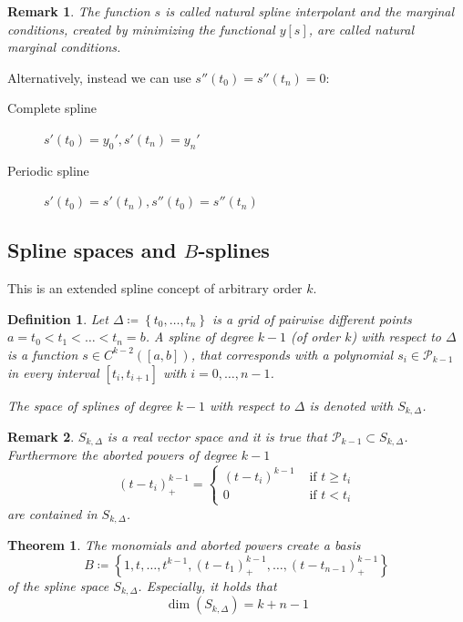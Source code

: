 \documentclass[a4paper]{article}
\newcounter{lecref}[section]
\numberwithin{lecref}{section}
\theoremstyle{break}
\newtheorem*{Thm}{Theorem}
\newtheorem{definition}[lecref]{Definition}
\newtheorem*{Remark}{Remark}
\newcommand{\Set}[1]{\left\{#1\right\}}
\begin{document}
\begin{Remark}
  The function $s$ is called \emph{natural spline interpolant} and the marginal conditions, created by minimizing the functional $y[s]$, are called \emph{natural marginal conditions}.
\end{Remark}

Alternatively, instead we can use $s''(t_0) = s''(t_n) = 0$:
\begin{description}
  \item[Complete spline]  $s'(t_0) = y_0', s'(t_n) = y_n'$
  \item[Periodic spline] $s'(t_0) = s'(t_n), s''(t_0) = s''(t_n)$
\end{description}

\subsection{Spline spaces and $B$-splines}

This is an extended spline concept of arbitrary order $k$.

\begin{definition}
  \label{definition:4-19}
  Let $\Delta \coloneqq \Set{t_0, \dots, t_n}$ is a grid of pairwise different points $a = t_0 < t_1 < \dots < t_n = b$.
  A spline of degree $k-1$ (of order $k$) with respect to $\Delta$ is a function $s \in C^{k-2}([a,b])$, that corresponds with a polynomial $s_i \in \mathcal P_{k-1}$ in every interval $[t_i, t_{i+1}]$ with $i = 0, \dots, n-1$.

  The space of splines of degree $k-1$ with respect to $\Delta$ is denoted with $S_{k, \Delta}$.
\end{definition}

\begin{Remark}
  $S_{k,\Delta}$ is a real vector space and it is true that $\mathcal P_{k-1} \subset S_{k,\Delta}$.
  Furthermore the aborted powers of degree $k-1$
  \[
    (t - t_i)_+^{k-1} = \begin{cases}
      (t - t_i)^{k-1} & \text{ if } t \geq t_i \\
      0 & \text{ if } t < t_i
    \end{cases}
  \]
  are contained in $S_{k,\Delta}$.
\end{Remark}

\begin{Thm}
  \label{theorem:4-20}
  The monomials and aborted powers create a basis
  \[ B \coloneqq \Set{1, t, \dots, t^{k-1}, (t - t_1)_+^{k-1}, \dots, (t - t_{n-1})_+^{k-1}} \]
  of the spline space $S_{k,\Delta}$. Especially, it holds that
  \[ \dim(S_{k,\Delta}) = k + n - 1 \]
\end{Thm}
\end{document}
